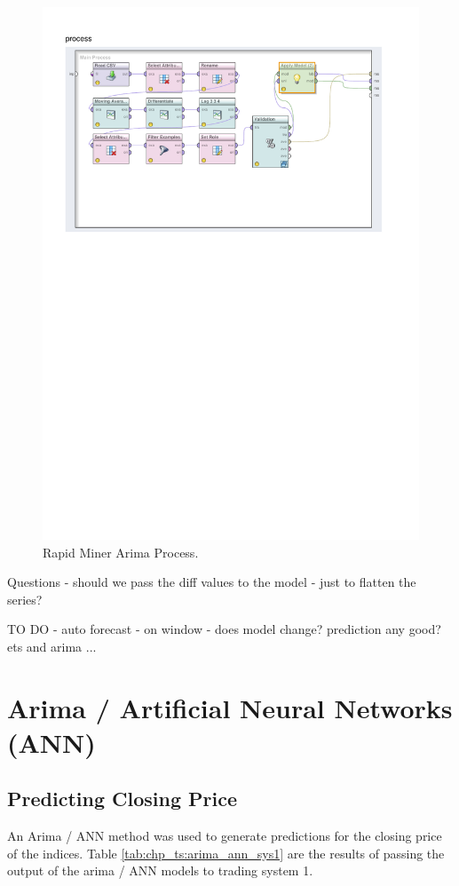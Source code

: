 \begin{figure}[!tbh]
\centering
\includegraphics[width=12cm]{../Figures/chp_ts_rm_arima}
\caption[Rapid Miner Arima Process]{Rapid Miner Arima Process.}
\label{fig:chp_ts_rm_arima}
\end{figure}

Questions - should we pass the diff values to the model - just to flatten the series?

TO DO - auto forecast - on window - does model change? prediction any good? ets and arima ...

\section{Arima / Artificial Neural Networks (ANN)}
\subsection{Predicting Closing Price}
An Arima / ANN method was used to generate predictions for the closing price of the indices. Table \ref{tab:chp_ts:arima_ann_sys1} are the results of passing the output of the arima / ANN models to trading system 1.

